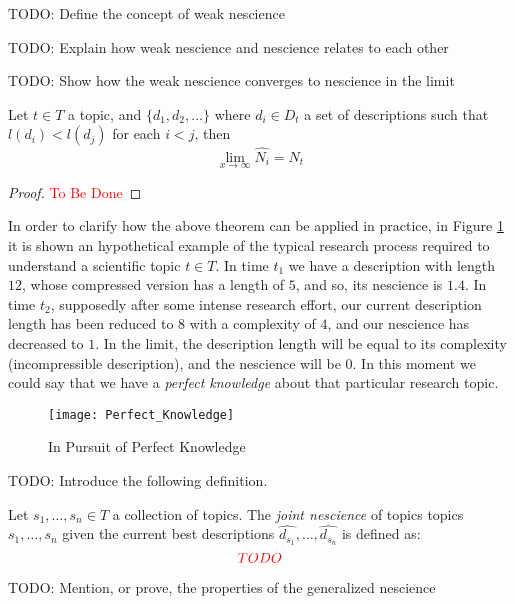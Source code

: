 {\color{red} TODO: Define the concept of weak nescience}

{\color{red} TODO: Explain how weak nescience and nescience relates to each other}

{\color{red} TODO: Show how the weak nescience converges to nescience in the limit}

\begin{theorem}
Let $t\in T$ a topic, and $\{d_1, d_2, \ldots \}$ where $d_i \in D_t$ a set of descriptions such that $ l(d_i) < l(d_j)$ for each $i < j$, then
\[
\lim_{x \to \infty} \hat{N_i} = N_t
\]
\end{theorem}
\begin{proof}
\textcolor{red}{To Be Done}
\end{proof}

\begin{example}
In order to clarify how the above theorem can be applied in practice, in Figure \ref{fig:Perfect_Knowledge} it is shown an hypothetical example of the typical research process required to understand a scientific topic $t\in T$. In time $t_{1}$ we have a description with length $12$, whose compressed version has a length of $5$, and so, its nescience is $1.4$. In time $t_{2}$, supposedly after some intense research effort, our current description length has been reduced to $8$ with a complexity of $4$, and our nescience has decreased to $1$. In the limit, the description length will be equal to its complexity (incompressible description), and the nescience will be 0. In this moment we could say that we have a \emph{perfect knowledge} about that particular research topic.
\end{example}

\begin{figure}[h]
\centering\texttt{[image: Perfect\_Knowledge]}
\caption{\label{fig:Perfect_Knowledge}In Pursuit of Perfect Knowledge}
\end{figure}

{\color{red} TODO: Introduce the following definition.}

\begin{definition}
Let $s_{1}, \ldots, s_{n} \in T$ a collection of topics. The \emph{joint nescience} of topics topics $s_{1}, \ldots, s_{n}$ given the current best descriptions $\hat{d_{s_1}}, \ldots, \hat{d_{s_n}}$ is defined as: 
\[
{\color{red} TODO}
\]
\end{definition}

{\color{red} TODO: Mention, or prove, the properties of the generalized nescience}


